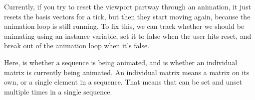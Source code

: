 \documentclass[../development.tex]{subfiles}
\begin{document}
Currently, if you try to reset the viewport partway through an animation, it just resets the basis vectors for a tick, but then they start moving again, because the animation loop is still running. To fix this, we can track whether we should be animating using an instance variable, set it to false when the user hits reset, and break out of the animation loop when it's false.



Here,  is whether a sequence is being animated, and  is whether an individual matrix is currently being animated. An individual matrix means a matrix on its own, or a single element in a sequence. That means that  can be set and unset multiple times in a single sequence.
\end{document}
